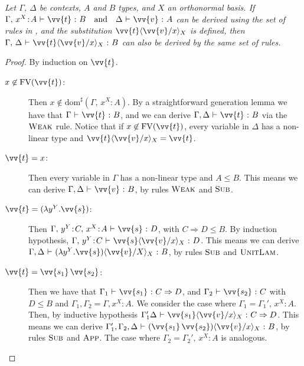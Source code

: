 \documentclass[runningheads,orivec,envcountsame,envcountsect]{llncs}
\newcommand\ansubst[2]{\ensuremath{\langle #1 \rangle_{#2}}}
\newcommand\sdom[1]{\mathrm{dom}^{\sharp}(#1)}
\newcommand\FV[1]{\mathrm{FV}(#1)}
\def\Lam#1#2#3{\lambda#1^{#2}{.}#3} %
\def\Arr{\Rightarrow}
\def\TYP#1#2#3{#1~{\vdash}~#2~{:}~#3}
\begin{document}
\begin{restatelemma}
  \itshape
  Let $\Gamma$, $\Delta$ be contexts, $A$ and $B$ types, and $X$ an orthonormal basis.
  If
  \(
    \TYP{\Gamma,\,x^{X}\!:\!A}{\vv{t}}{B}
    \quad\text{and}\quad
    \TYP{\Delta}{\vv{v}}{A}
  \) can be derived using the set of rules in ,
  and the substitution $\vv{t}\ansubst{\vv{v}/x}{X}$ is defined,
  then
  \(
    \TYP{\Gamma,\,\Delta}{\vv{t}\ansubst{\vv{v}/x}{X}}{B}
  \) can also be derived by the same set of rules.

\end{restatelemma}
\begin{proof}
  By induction on $\vv{t}$.
  \begin{description}
    \item[$x\not\in\FV{\vv{t}}$:] Then $x\not\in\sdom{\Gamma,\,x^{X}\!:\!A}$. By a straightforward generation lemma we have that $\TYP{\Gamma}{\vv{t}}{B}$, and we can derive $\TYP{\Gamma,\Delta}{\vv{t}}{B}$ via the $\textsc{Weak}$ rule. Notice that if $x\not\in\FV{\vv{t}}$, every variable in $\Delta$ has a non-linear type and $\vv{t}\ansubst{\vv{v}/x}{X}=\vv{t}$.
    
    \item[$\vv{t}=x$:] Then every variable in $\Gamma$ has a non-linear type and $A\leq B$. This means we can derive $\TYP{\Gamma,\Delta}{\vv{v}}{B}$, by rules $\textsc{Weak}$ and $\textsc{Sub}$.
    
    \item[$\vv{t}=(\Lam{y}{Y}{\vv{s}})$:] Then $\TYP{\Gamma,\,y^{Y}\!:\!C,\,x^{X}\!:\!A}{\vv{s}}{D}$, with $C\Arr D\leq B$. By induction hypothesis, $\TYP{\Gamma,\,y^{Y}\!:\!C}{\vv{s}\ansubst{\vv{v}/x}{X}}{D}$. This means we can derive $\TYP{\Gamma,\Delta}{(\Lam{y}{Y}{\vv{s}})\ansubst{\vv{v}/X}{X}}{B}$, by rules $\textsc{Sub}$ and $\textsc{UnitLam}$.
    
    \item[$\vv{t}=\vv{s_1}\,\vv{s_2}$:] Then we have that $\TYP{\Gamma_1}{\vv{s_1}}{C\Arr D}$, and $\TYP{\Gamma_2}{\vv{s_2}}{C}$ with $D\leq B$ and $\Gamma_1,\Gamma_2 = \Gamma,x^{X}\!:\!A$. We consider the case where $\Gamma_1 = \Gamma_1',\,x^{X}\!:\!A$. Then, by inductive hypothesis $\TYP{\Gamma_1'\Delta}{\vv{s_1}\ansubst{\vv{v}/x}{X}}{C\Arr D}$. This means we can derive $\TYP{\Gamma_1',\Gamma_2,\Delta}{(\vv{s_1}\,\vv{s_2})\ansubst{\vv{v}/x}{X}}{B}$, by rules $\textsc{Sub}$ and $\textsc{App}$. The case where $\Gamma_2 = \Gamma_2',\,x^{X}\!:\!A$ is analogous.
    

\end{description}
\end{proof}
\end{document}
